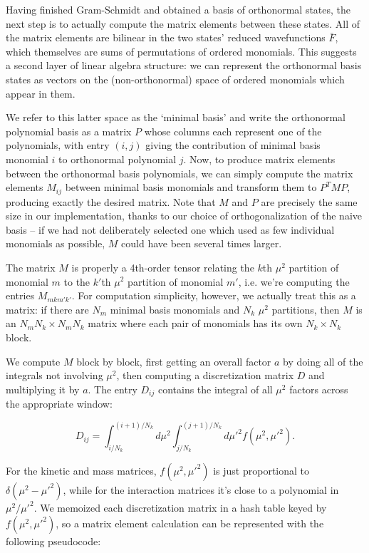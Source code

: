 {Having finished Gram-Schmidt and obtained a basis of orthonormal states, the
next step is to actually compute the matrix elements between these states. All
of the matrix elements are bilinear in the two states' reduced wavefunctions
$\bar F$, which themselves are sums of permutations of ordered monomials. This
suggests a second layer of linear algebra structure: we can represent the 
orthonormal basis states as vectors on the (non-orthonormal) space of ordered
monomials which appear in them. 

We refer to this latter space as the `minimal basis' and write the orthonormal 
polynomial basis as a matrix $P$ whose columns each represent one of the 
polynomials, with entry $(i,j)$ giving the contribution of minimal basis 
monomial $i$ to orthonormal polynomial $j$. Now, to produce matrix elements 
between the orthonormal basis polynomials, we can simply compute the matrix 
elements $M_{ij}$ between minimal basis monomials and transform them to 
$P^T M P$, producing exactly the desired matrix. Note that $M$ and $P$ are
precisely the same size in our implementation, thanks to our choice of
orthogonalization of the naive basis -- if we had not deliberately selected one 
which used as few individual monomials as possible, $M$ could have been several 
times larger.

The matrix $M$ is properly a 4th-order tensor relating the $k$th $\mu^2$ 
partition of monomial $m$ to the $k'$th $\mu^2$ partition of monomial $m'$, i.e.
we're computing the entries $M_{mkm'k'}$. For computation simplicity, however,
we actually treat this as a matrix: if there are $N_m$ minimal basis monomials
and $N_k$ $\mu^2$ partitions, then $M$ is an $N_m N_k \times N_m N_k$ matrix
where each pair of monomials has its own $N_k \times N_k$ block. 

We compute $M$ block by block, first getting an overall factor $a$ by doing all 
of the integrals not involving $\mu^2$, then computing a discretization matrix 
$D$ and multiplying it by $a$. The entry $D_{ij}$ contains the integral of all
$\mu^2$ factors across the appropriate window:

\begin{equation}
    D_{ij} = \int_{i/N_k}^{(i+1)/N_k} d\mu^2 \int_{j/N_k}^{(j+1)/N_k} d\mu'^2
             f(\mu^2, \mu'^2).
\end{equation}

For the kinetic and mass matrices, $f(\mu^2, \mu'^2)$ is just proportional to
$\delta(\mu^2 - \mu'^2)$, while for the interaction matrices it's close to a 
polynomial in $\mu^2/\mu'^2$. We memoized each discretization matrix in a hash
table keyed by $f(\mu^2, \mu'^2)$, so a matrix element calculation can be 
represented with the following pseudocode:

}

